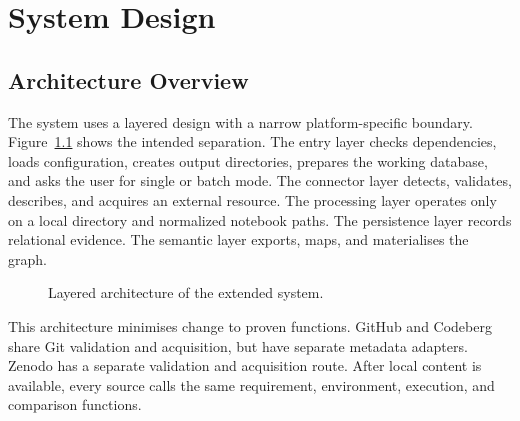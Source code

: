 \chapter{System Design}
\label{chap:design}

\section{Architecture Overview}

The system uses a layered design with a narrow platform-specific boundary. Figure~\ref{fig:architecture} shows the intended separation. The entry layer checks dependencies, loads configuration, creates output directories, prepares the working database, and asks the user for single or batch mode. The connector layer detects, validates, describes, and acquires an external resource. The processing layer operates only on a local directory and normalized notebook paths. The persistence layer records relational evidence. The semantic layer exports, maps, and materialises the graph.

\begin{figure}[ht]
\centering
{}
\caption{Layered architecture of the extended system.}
\label{fig:architecture}
\end{figure}

This architecture minimises change to proven functions. GitHub and Codeberg share Git validation and acquisition, but have separate metadata adapters. Zenodo has a separate validation and acquisition route. After local content is available, every source calls the same requirement, environment, execution, and comparison functions.

